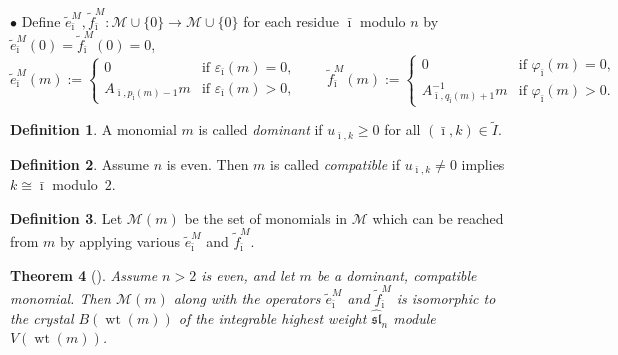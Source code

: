 \documentclass[11pt]{article}
\newtheorem{Theorem}{Theorem}[section]
\theoremstyle{definition}
\newtheorem{Definition}[Theorem]{Definition}
\newcommand{\wt}{\operatorname{wt}}
\newcommand{\asl}{\widehat{\mathfrak{{sl}}}}
\begin{document}
$\bullet$ Def\/ine $\tilde{e}_{\bar \imath}^M,\tilde{f}_{\bar \imath}^M\colon \mathcal{M} \cup \{ 0 \} \to \mathcal{M} \cup\{0\}$ for each residue $\bar \imath$ modulo $n$
by $\tilde{e}_{\bar \imath}^M(0)= \tilde{f}_{\bar \imath}^M(0)=0$,
\begin{equation} \label{ef-def}
   \tilde{e}^M_{\bar \imath}(m) :=
  \begin{cases}
    0 & \text{if $\varepsilon_{\bar \imath}(m) = 0$},
    \\
   A_{\bar \imath,p_{\bar \imath}(m)-1}m & \text{if $\varepsilon_{\bar \imath}(m) > 0$},
  \end{cases}
\qquad \tilde{f}^M_{\bar \imath}(m) :=
  \begin{cases}
    0 & \text{if $\varphi_{\bar \imath}(m) = 0$},
    \\
   A_{\bar \imath,q_{\bar \imath}(m)+1}^{-1}m & \text{if $\varphi_{\bar \imath}(m) > 0$}.
  \end{cases}
\end{equation}



\begin{Definition} A monomial $m$ is called \emph{dominant} if $u_{\bar \imath, k} \geq 0$ for all $(\bar \imath, k) \in \widetilde I.$
\end{Definition}

\begin{Definition} \label{compatibe-def} Assume $n$ is even. Then
$m$ is called \emph{compatible} if $u_{\bar \imath, k} \neq 0$ implies $k \cong \bar \imath$ modulo~$2$.
\end{Definition}

\begin{Definition}
Let $\mathcal{M}(m)$ be the set of monomials in $\mathcal{M}$ which can be reached from $m$ by applying various $\tilde e_{\bar \imath}^M$ and $\tilde f_{\bar \imath}^M$.
\end{Definition}

\begin{Theorem}[]  \label{mono-th}
Assume $n >2$ is even, and let $m$ be a dominant, compa\-tib\-le monomial. Then $\mathcal{M}(m)$ along with the operators $\tilde e_{\bar \imath}^M$ and $\tilde f_{\bar \imath}^M$ is isomorphic to the crystal $B({\wt(m)})$ of the integrable highest weight $\asl_n$ module $V({\wt(m)})$.
\end{Theorem}
\end{document}

